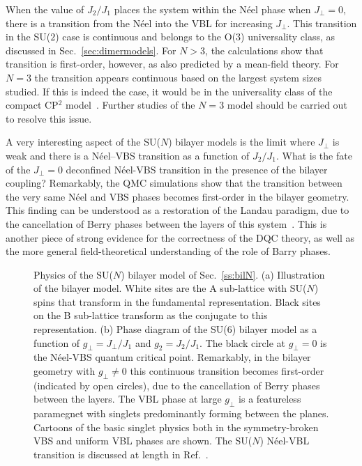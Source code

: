 \documentclass[range]{ar2e}
\begin{document}
When the value of $J_2/J_1$ places the system within the N\'eel phase when $J_\perp=0$, there is a transition  from
the N\'eel into the VBL for increasing $J_\perp$. This transition in the SU($2$) case is continuous and belongs to the O($3$) universality class,
as discussed in Sec.~\ref{sec:dimermodels}. For $N>3$, the calculations show that transition is first-order, however, as also predicted by a mean-field 
theory. For $N=3$ the transition appears continuous based on the largest system sizes studied. If this is indeed the case, it would be in the universality 
class of the compact CP$^2$ model~\cite{nahum2011:loops}. Further studies of the $N=3$ model should be carried out to resolve this issue.

A very interesting aspect of the SU($N$) bilayer models is the limit where $J_\perp$ is weak and there is a N\'eel--VBS transition as a function of $J_2/J_1$.
What is the fate of the $J_\perp=0$ deconfined N\'eel-VBS transition in the presence of the bilayer coupling? Remarkably, the QMC simulations show that the 
transition between the very same N\'eel and VBS phases becomes first-order in the bilayer geometry. This finding can be understood as a restoration of the 
Landau paradigm, due to the cancellation of Berry phases between the layers of this system~\cite{kaul2012:sun_bil}. This is another piece of strong evidence 
for the correctness of the DQC theory, as well as the more general field-theoretical understanding of the role of Barry phases.

\begin{figure}
\centerline{}
  \caption{ \label{fig:pd_bil}  Physics of the SU($N$) bilayer model  of Sec.~\ref{ss:bilN}.  (a) Illustration of the bilayer model. White sites are the A sub-lattice with 
  SU($N$) spins that transform in the fundamental representation. Black sites on the B sub-lattice transform as the conjugate to this representation. (b) Phase diagram of the
  SU($6$) bilayer model as a function of $g_\perp =J_\perp/J_1$ and $g_2=J_2/J_1$. The black circle at $g_\perp=0$ is the N\'eel-VBS quantum critical point. Remarkably, 
  in the bilayer geometry with $g_\perp\neq 0$ this continuous transition becomes first-order (indicated by open circles), due to the cancellation of Berry phases between 
  the layers. The VBL phase at large $g_\perp$ is a featureless paramegnet with singlets predominantly forming between the planes. Cartoons of the basic singlet physics 
  both in the symmetry-broken VBS and uniform VBL phases are shown. The SU($N$) N\'eel-VBL transition is discussed at length in Ref.~\cite{kaul2012:sun_bil}.}
\end{figure}
\end{document}
